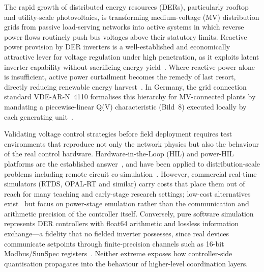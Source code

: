 \documentclass[conference]{IEEEtran}
\begin{document}
The rapid growth of distributed energy resources (DERs), particularly
rooftop and utility-scale photovoltaics, is transforming medium-voltage
(MV) distribution grids from passive load-serving networks into active
systems in which reverse power flows routinely push bus voltages above
their statutory limits. Reactive power provision by DER inverters is a
well-established and economically attractive lever for voltage regulation
under high penetration, as it exploits latent inverter capability without
sacrificing energy yield~\cite{turitsyn2011}. Where reactive power alone
is insufficient, active power curtailment becomes the remedy of last
resort, directly reducing renewable energy harvest~\cite{tonkoski2011}.
In Germany, the grid connection standard VDE-AR-N~4110 formalises this
hierarchy for MV-connected plants by mandating a piecewise-linear Q(V)
characteristic (Bild~8) executed locally by each generating
unit~\cite{vde4110}.

Validating voltage control strategies before field deployment requires
test environments that reproduce not only the network physics but also
the behaviour of the real control hardware. Hardware-in-the-Loop (HIL)
and power-HIL platforms are the established answer~\cite{faruque2015,
lauss2016}, and have been applied to distribution-scale problems
including remote circuit co-simulation~\cite{palmintier2015}. However,
commercial real-time simulators (RTDS, OPAL-RT and similar) carry costs
that place them out of reach for many teaching and early-stage research
settings; low-cost alternatives exist~\cite{haidekker2023} but focus on
power-stage emulation rather than the communication and arithmetic
precision of the controller itself. Conversely, pure software simulation
represents DER controllers with float64 arithmetic and lossless
information exchange---a fidelity that no fielded inverter possesses,
since real devices communicate setpoints through finite-precision
channels such as 16-bit Modbus/SunSpec registers~\cite{sunspec,
modbus, ieee1547}. Neither extreme exposes how controller-side
quantisation propagates into the behaviour of higher-level coordination
layers.
\end{document}
